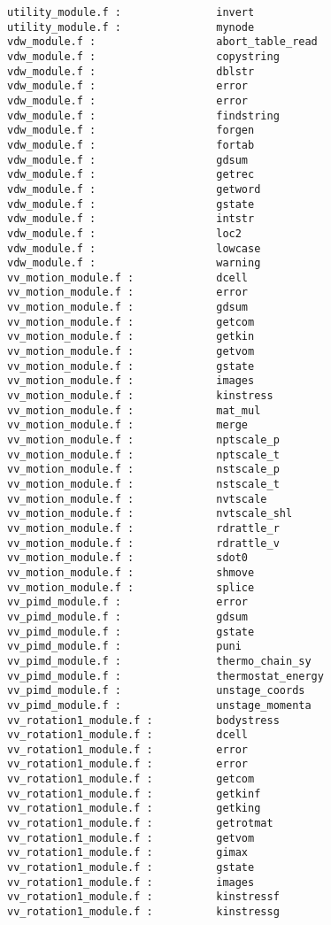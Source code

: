 \begin{verbatim}
utility_module.f :               invert 
utility_module.f :               mynode
vdw_module.f :                   abort_table_read 
vdw_module.f :                   copystring 
vdw_module.f :                   dblstr
vdw_module.f :                   error 
vdw_module.f :                   error 
vdw_module.f :                   findstring
vdw_module.f :                   forgen 
vdw_module.f :                   fortab 
vdw_module.f :                   gdsum 
vdw_module.f :                   getrec 
vdw_module.f :                   getword 
vdw_module.f :                   gstate 
vdw_module.f :                   intstr
vdw_module.f :                   loc2
vdw_module.f :                   lowcase 
vdw_module.f :                   warning 
vv_motion_module.f :             dcell 
vv_motion_module.f :             error 
vv_motion_module.f :             gdsum 
vv_motion_module.f :             getcom 
vv_motion_module.f :             getkin
vv_motion_module.f :             getvom 
vv_motion_module.f :             gstate 
vv_motion_module.f :             images 
vv_motion_module.f :             kinstress 
vv_motion_module.f :             mat_mul 
vv_motion_module.f :             merge 
vv_motion_module.f :             nptscale_p 
vv_motion_module.f :             nptscale_t 
vv_motion_module.f :             nstscale_p 
vv_motion_module.f :             nstscale_t 
vv_motion_module.f :             nvtscale 
vv_motion_module.f :             nvtscale_shl 
vv_motion_module.f :             rdrattle_r 
vv_motion_module.f :             rdrattle_v 
vv_motion_module.f :             sdot0
vv_motion_module.f :             shmove 
vv_motion_module.f :             splice 
vv_pimd_module.f :               error 
vv_pimd_module.f :               gdsum 
vv_pimd_module.f :               gstate 
vv_pimd_module.f :               puni
vv_pimd_module.f :               thermo_chain_sy 
vv_pimd_module.f :               thermostat_energy 
vv_pimd_module.f :               unstage_coords 
vv_pimd_module.f :               unstage_momenta 
vv_rotation1_module.f :          bodystress 
vv_rotation1_module.f :          dcell 
vv_rotation1_module.f :          error 
vv_rotation1_module.f :          error 
vv_rotation1_module.f :          getcom 
vv_rotation1_module.f :          getkinf
vv_rotation1_module.f :          getking 
vv_rotation1_module.f :          getrotmat 
vv_rotation1_module.f :          getvom 
vv_rotation1_module.f :          gimax 
vv_rotation1_module.f :          gstate 
vv_rotation1_module.f :          images 
vv_rotation1_module.f :          kinstressf 
vv_rotation1_module.f :          kinstressg 

\end{verbatim}
